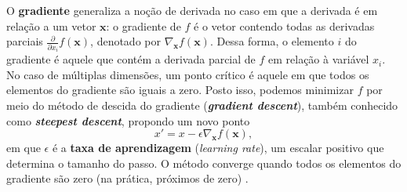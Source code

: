 \documentclass{automatextcc}
\newcommand{\R}{\mathds{R}}
\newcommand{\bs}[1]{\boldsymbol{#1}}
\begin{document}
O \textbf{gradiente} generaliza a noção de derivada no caso em que a derivada é em relação a um vetor $\bs{x}$: o gradiente de $f$ é o vetor contendo todas as derivadas parciais $\frac{\partial}{\partial x_i} f(\bs{x})$, denotado por $\nabla_{\bs{x}} f(\bs{x})$. Dessa forma, o elemento $i$ do gradiente é aquele que contém a derivada parcial de $f$ em relação à variável $x_i$. No caso de múltiplas dimensões, um ponto crítico é aquele em que todos os elementos do gradiente são iguais a zero. Posto isso, podemos minimizar $f$ por meio do método de descida do gradiente (\textit{\textbf{gradient descent}}), também conhecido como \textit{\textbf{steepest descent}}, propondo um novo ponto
\begin{equation*}
    x' = x - \epsilon \nabla_{\bs{x}} f(\bs{x}),
\end{equation*}
em que $\epsilon$ é a \textbf{taxa de aprendizagem} (\textit{learning rate}), um escalar positivo que determina o tamanho do passo. O método converge quando todos os elementos do gradiente são zero (na prática, próximos de zero) \citep{goodfellow2016}. 







\end{document}
